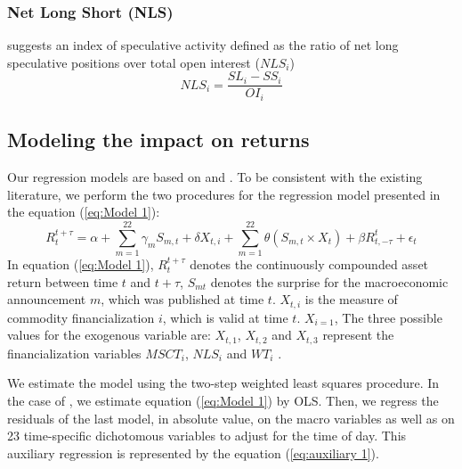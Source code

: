 \documentclass[12pt]{article}
\begin{document}
\subsubsection{Net Long Short (NLS)}
\citet{hedegaard2011margins} suggests an index of speculative activity defined as the ratio of net long speculative positions over total open interest ($NLS_i$)
\begin{equation} \label{eqn:NLS}
NLS_i=\frac{SL_i-SS_i}{OI_i}
\end{equation}


\subsection{Modeling the impact on returns}\label{return}

Our regression models are based on \citet{kurov2019price} and \citet{andersen2007real}. To be consistent with the existing literature, we perform the two procedures for the regression model presented in the equation (\ref{eq:Model 1}):
\begin{equation}\label{eq:Model 1}
R_{t}^{t+\tau}=\alpha+\sum_{m=1}^{22} \gamma_m S_{m,t}+ \delta X_{t,i} + \sum_{m=1}^{22} \theta (S_{m,t} \times X_t)+\beta R_{t,-\tau}^{t}+\epsilon_{t} 
\end{equation}
In equation (\ref{eq:Model 1}), $R_{t}^{t+\tau}$ denotes the continuously compounded asset return between time $t$ and $t+\tau$, $S_{mt}$ denotes the surprise for the macroeconomic announcement $m$, which was published at time $t$. $X_{t,i}$ is the measure of commodity financialization $i$,  which is valid at time $t$. $X_{i = 1}$, The three possible values for the exogenous variable are:  $X_{t,1}$, $X_{t,2}$ and $X_{t,3}$ represent the financialization variables $MSCT_i$, $NLS_i$ and $WT_i$ . 

We estimate the model using the two-step weighted least squares procedure. In the case of \citet{andersen2007real}, we estimate equation (\ref{eq:Model 1}) by OLS. Then, we regress the residuals of the last model, in absolute value, on the macro variables as well as on 23 time-specific dichotomous variables to adjust for the time of day. This auxiliary regression is represented by the equation (\ref{eq:auxiliary 1}).
\end{document}
